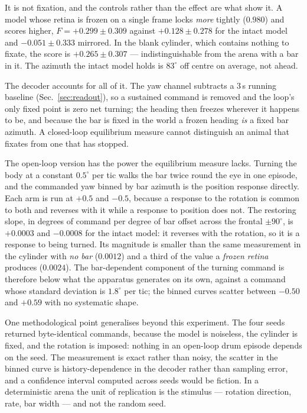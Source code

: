 \documentclass[10pt,twoside]{article}
\begin{document}
It is not fixation, and the controls rather than the effect are what show it. A
model whose retina is frozen on a single frame locks \emph{more} tightly
($0.980$) and scores higher, $F = +0.299\pm0.309$ against $+0.128\pm0.278$ for
the intact model and $-0.051\pm0.333$ mirrored. In the blank cylinder, which
contains nothing to fixate, the score is $+0.265\pm0.307$ --- indistinguishable
from the arena with a bar in it. The azimuth the intact model holds is
$83^\circ$ off centre on average, not ahead.

The decoder accounts for all of it. The yaw channel subtracts a 3\,s running
baseline (Sec.~\ref{sec:readout}), so a sustained command is removed and the
loop's only fixed point is zero net turning; the heading then freezes wherever
it happens to be, and because the bar is fixed in the world a frozen heading
\emph{is} a fixed bar azimuth. A closed-loop equilibrium measure cannot
distinguish an animal that fixates from one that has stopped.

The open-loop version has the power the equilibrium measure lacks. Turning the
body at a constant $0.5^\circ$ per tic walks the bar twice round the eye in one
episode, and the commanded yaw binned by bar azimuth is the position response
directly. Each arm is run at $+0.5$ and $-0.5$, because a response to the
rotation is common to both and reverses with it while a response to position
does not. The restoring slope, in degrees of command per degree of bar offset
across the frontal $\pm90^\circ$, is $+0.0003$ and $-0.0008$ for the intact
model: it reverses with the rotation, so it is a response to being turned. Its
magnitude is smaller than the same measurement in the cylinder with \emph{no
bar} ($0.0012$) and a third of the value a \emph{frozen retina} produces
($0.0024$). The bar-dependent component of the turning command is therefore
below what the apparatus generates on its own, against a command whose standard
deviation is $1.8^\circ$ per tic; the binned curves scatter between $-0.50$ and
$+0.59$ with no systematic shape.

One methodological point generalises beyond this experiment. The four seeds
returned byte-identical commands, because the model is noiseless, the cylinder
is fixed, and the rotation is imposed: nothing in an open-loop drum episode
depends on the seed. The measurement is exact rather than noisy, the scatter in
the binned curve is history-dependence in the decoder rather than sampling
error, and a confidence interval computed across seeds would be fiction. In a
deterministic arena the unit of replication is the stimulus --- rotation
direction, rate, bar width --- and not the random seed.
\end{document}
